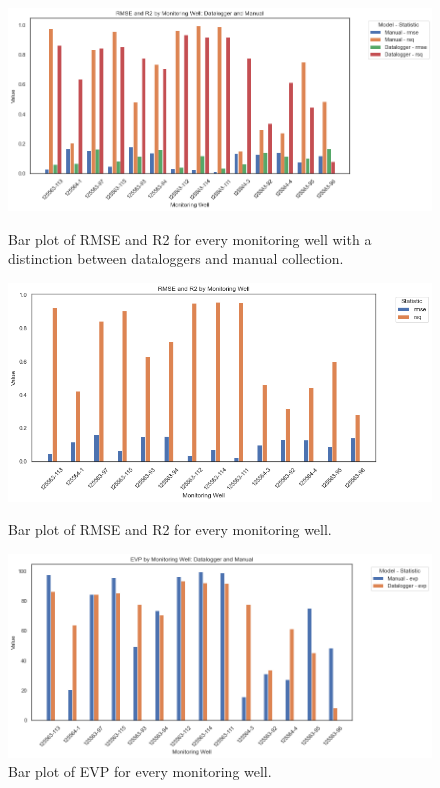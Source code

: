 \begin{figure}[htbp]
    \centering
    \begin{minipage}{0.48\textwidth}
        \centering
        \includegraphics[width=\linewidth]{rmser2heij.png}
        \caption{Bar plot of RMSE and R2 for every monitoring well with a distinction between dataloggers and manual collection.}
        \label{fig:rmser2heij}
    \end{minipage}\hfill
    \begin{minipage}{0.48\textwidth}
        \centering
        \includegraphics[width=\linewidth]{rmr2heij.png}
        \caption{Bar plot of RMSE and R2 for every monitoring well.}
        \label{fig:rmr2heij}
    \end{minipage}\hfill
    \begin{minipage}{0.48\textwidth}
        \centering
        \includegraphics[width=\linewidth]{evpheij.png}
        \caption{Bar plot of EVP for every monitoring well.}   
        \label{fig:evpheij}
    \end{minipage}
\end{figure}

